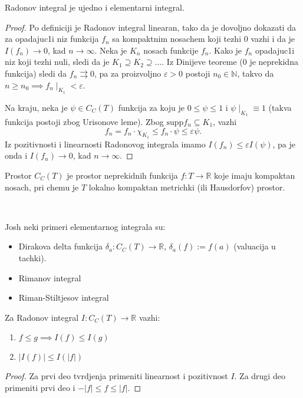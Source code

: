 \documentclass[a4paper,12pt]{article}
\newcommand{\NN}{\mathbb{N}}
\newcommand{\RR}{\mathbb{R}}
\newcommand{\eps}{\varepsilon}
\newcommand{\psj}{\subseteq}
\begin{document}
\begin{tvr}
	Radonov integral je ujedno i elementarni integral.
\end{tvr}
\begin{proof}
	Po definiciji je Radonov integral linearan, tako da je dovoljno dokazati da 
	za opadajuc1i niz funkcija $f_n$ sa kompaktnim nosachem koji tezhi $0$
	vazhi i da je $I(f_n) \to 0$, kad $n\to \infty$. Neka je $K_n$ nosach funkcije
	$f_n$. Kako je $f_n$ opadajuc1i niz koji tezhi nuli, sledi da je $K_1\supseteq K_2 \supseteq \dotso$.
	Iz Dinijeve teoreme ($0$ je neprekidna funkcija) sledi da $f_n\rightrightarrows 0$, pa za proizvoljno
	$\eps > 0$ postoji $n_0 \in \NN$, takvo da $n\geq n_0 \implies f_n\mid_{K_1} < \eps$.

	Na kraju, neka je $\psi \in  C_C(T)$ funkcija za koju je $0 \leq \psi \leq 1$ i $\psi \mid_{K_1} \equiv 1$ (takva
	funkcija postoji zbog Urisonove leme). Zbog $\mathrm{supp} f_n \psj K_1$, vazhi
	\[ f_n = f_n \cdot \chi_{K_1} \leq f_n \cdot \psi \leq \eps \psi .\] 
	Iz pozitivnosti i linearnosti Radonovog integrala imamo $I(f_n) \leq \eps I(\psi)$, pa je onda i $I(f_n)\to 0$, kad
	$n\to \infty$.
\end{proof}

\begin{nap}
	Prostor $C_C(T)$ je prostor neprekidnih funkcija $f:T\to \RR$ koje imaju kompaktan nosach, pri chemu je 
	$T$ lokalno kompaktan metrichki (ili Hausdorfov) prostor.
\end{nap}
\\
\begin{pr}
	Josh neki primeri elementarnog integrala su:
	\begin{itemize}
		\item Dirakova delta funkcija $\delta_a: C_C(T)\to \RR$, $\delta_a(f):=f(a)$ (valuacija u tachki).
		\item Rimanov integral
		\item Riman-Stiltjesov integral
	\end{itemize}
\end{pr}

\begin{lema}
	Za Radonov integral $I: C_C(T) \to \RR$ vazhi:
	\begin{enumerate}
		\item $f \leq g \implies I(f) \leq I(g)$
		\item $|I(f)| \leq I(|f|)$
	\end{enumerate}
\end{lema}
\begin{proof}
	Za prvi deo tvrdjenja primeniti linearnost i pozitivnost $I$. Za drugi deo prime\-niti prvi deo i $-|f| \leq f \leq |f|$.
\end{proof}
\end{document}
